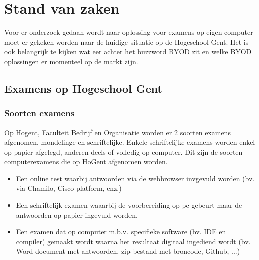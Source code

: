 \chapter{Stand van zaken}
\label{ch:stand-van-zaken}



Voor er onderzoek gedaan wordt naar oplossing voor examens op eigen computer moet er gekeken worden naar de huidige situatie op de Hogeschool Gent. Het is ook belangrijk te kijken wat eer achter het buzzword BYOD zit en welke BYOD oplossingen er momenteel op de markt zijn. 

\section{Examens op Hogeschool Gent}

\subsection{Soorten examens}
Op Hogent, Faculteit Bedrijf en Organisatie worden er 2 soorten examens afgenomen, mondelinge en schriftelijke. Enkele schriftelijke examens worden enkel op papier afgelegd, anderen deels of volledig op computer. Dit zijn de soorten computerexamens die op HoGent afgenomen worden.
\begin{itemize}
\item Een online test waarbij antwoorden via de webbrowser invgevuld worden (bv. via Chamilo, Cisco-platform, enz.)
\item Een schriftelijk examen waaarbij de voorbereiding op pc gebeurt maar de antwoorden op papier ingevuld worden.
\item Een examen dat op computer m.b.v. specifieke software (bv. IDE en compiler) gemaakt wordt waarna het resultaat digitaal ingediend wordt (bv. Word document met antwoorden, zip-bestand met broncode, Github, ...)
\end{itemize}


